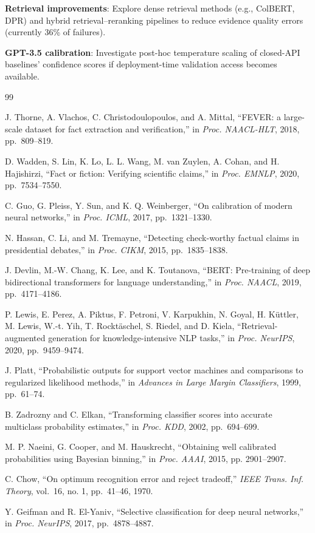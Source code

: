 \textbf{Retrieval improvements}: Explore dense retrieval methods (e.g., ColBERT, DPR) and hybrid retrieval--reranking pipelines to reduce evidence quality errors (currently 36\% of failures).

\textbf{GPT-3.5 calibration}: Investigate post-hoc temperature scaling of closed-API baselines' confidence scores if deployment-time validation access becomes available.

99

J. Thorne, A. Vlachos, C. Christodoulopoulos, and A. Mittal, ``FEVER: a large-scale dataset for fact extraction and verification,'' in \emph{Proc. NAACL-HLT}, 2018, pp.~809--819.

D. Wadden, S. Lin, K. Lo, L. L. Wang, M. van Zuylen, A. Cohan, and H. Hajishirzi, ``Fact or fiction: Verifying scientific claims,'' in \emph{Proc. EMNLP}, 2020, pp.~7534--7550.

C. Guo, G. Pleiss, Y. Sun, and K. Q. Weinberger, ``On calibration of modern neural networks,'' in \emph{Proc. ICML}, 2017, pp.~1321--1330.

N. Hassan, C. Li, and M. Tremayne, ``Detecting check-worthy factual claims in presidential debates,'' in \emph{Proc. CIKM}, 2015, pp.~1835--1838.

J. Devlin, M.-W. Chang, K. Lee, and K. Toutanova, ``BERT: Pre-training of deep bidirectional transformers for language understanding,'' in \emph{Proc. NAACL}, 2019, pp.~4171--4186.

P. Lewis, E. Perez, A. Piktus, F. Petroni, V. Karpukhin, N. Goyal, H. Küttler, M. Lewis, W.-t. Yih, T. Rocktäschel, S. Riedel, and D. Kiela, ``Retrieval-augmented generation for knowledge-intensive NLP tasks,'' in \emph{Proc. NeurIPS}, 2020, pp.~9459--9474.

J. Platt, ``Probabilistic outputs for support vector machines and comparisons to regularized likelihood methods,'' in \emph{Advances in Large Margin Classifiers}, 1999, pp.~61--74.

B. Zadrozny and C. Elkan, ``Transforming classifier scores into accurate multiclass probability estimates,'' in \emph{Proc. KDD}, 2002, pp.~694--699.

M. P. Naeini, G. Cooper, and M. Hauskrecht, ``Obtaining well calibrated probabilities using Bayesian binning,'' in \emph{Proc. AAAI}, 2015, pp. 2901--2907.

C. Chow, ``On optimum recognition error and reject tradeoff,'' \emph{IEEE Trans. Inf. Theory}, vol.~16, no. 1, pp.~41--46, 1970.

Y. Geifman and R. El-Yaniv, ``Selective classification for deep neural networks,'' in \emph{Proc. NeurIPS}, 2017, pp.~4878--4887.

